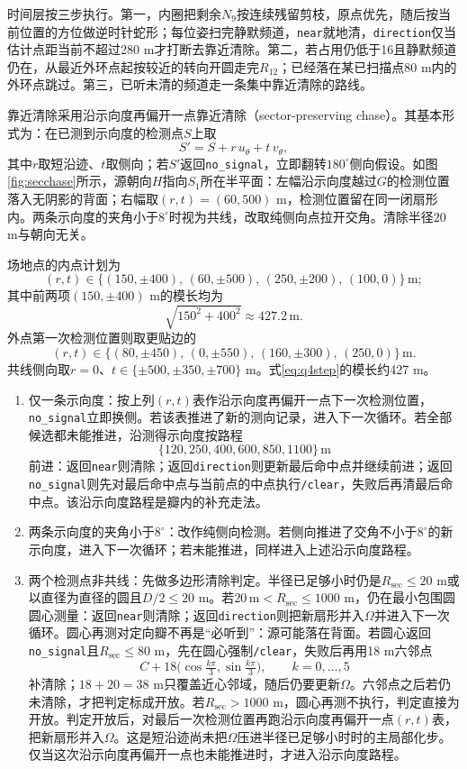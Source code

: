 \documentclass{cumcmthesis}
\begin{document}
时间层按三步执行。第一，内圈把剩余$N_9$按连续残留剪枝，原点优先，随后按当前位置的方位做逆时针蛇形；每位姿扫完静默频道，\texttt{near}就地清，\texttt{direction}仅当估计点距当前不超过280 m才打断去靠近清除。第二，若占用仍低于16且静默频道仍在，从最近外环点起按较近的转向开圆走完$R_{12}$；已经落在某已扫描点80 m内的外环点跳过。第三，已听未清的频道走一条集中靠近清除的路线。

靠近清除采用沿示向度再偏开一点靠近清除（sector-preserving chase）。其基本形式为：在已测到示向度的检测点$S$上取
\[
S'=S+r\,u_{\theta}+t\,v_{\theta},
\]
其中$r$取短沿迹、$t$取侧向；若$S'$返回\texttt{no\_signal}，立即翻转$180^\circ$侧向假设。如图\ref{fig:secchase}所示，源朝向$H$指向$S_1$所在半平面：左幅沿示向度越过$G$的检测位置落入无阴影的背面；右幅取$(r,t)=(60,500)$ m，检测位置留在同一闭扇形内。两条示向度的夹角小于$8^\circ$时视为共线，改取纯侧向点拉开交角。清除半径20 m与朝向无关。

场地点的内点计划为
\[
(r,t)\in\bigl\{(150,\pm 400),\,(60,\pm 500),\,(250,\pm 200),\,(100,0)\bigr\}\,\mathrm{m};
\]
其中前两项$(150,\pm 400)$ m的模长均为
\begin{equation}
\sqrt{150^2+400^2}\approx 427.2\,\mathrm{m}.
\label{eq:q4step}
\end{equation}
外点第一次检测位置则取更贴边的
\[
(r,t)\in\bigl\{(80,\pm 450),\,(0,\pm 550),\,(160,\pm 300),\,(250,0)\bigr\}\,\mathrm{m}.
\]
共线侧向取$r=0$、$t\in\{\pm 500,\pm 350,\pm 700\}$ m。式\eqref{eq:q4step}的模长约427 m。

\begin{enumerate}
\item 仅一条示向度：按上列$(r,t)$表作沿示向度再偏开一点下一次检测位置，\texttt{no\_signal}立即换侧。若该表推进了新的测向记录，进入下一次循环。若全部候选都未能推进，沿测得示向度按路程
\[
\{120,250,400,600,850,1100\}\,\mathrm{m}
\]
前进：返回\texttt{near}则清除；返回\texttt{direction}则更新最后命中点并继续前进；返回\texttt{no\_signal}则先对最后命中点与当前点的中点执行\texttt{/clear}，失败后再清最后命中点。该沿示向度路程是瓣内的补充走法。
\item 两条示向度的夹角小于$8^\circ$：改作纯侧向检测。若侧向推进了交角不小于$8^\circ$的新示向度，进入下一次循环；若未能推进，同样进入上述沿示向度路程。
\item 两个检测点非共线：先做多边形清除判定。半径已足够小时仍是$R_{\mathrm{sec}}\le 20$ m或以直径为直径的圆且$D/2\le 20$ m。若$20\,\mathrm{m}<R_{\mathrm{sec}}\le 1000$ m，仍在最小包围圆圆心测量：返回\texttt{near}则清除；返回\texttt{direction}则把新扇形并入$\Omega$并进入下一次循环。圆心再测对定向瓣不再是“必听到”：源可能落在背面。若圆心返回\texttt{no\_signal}且$R_{\mathrm{sec}}\le 80$ m，先在圆心强制\texttt{/clear}，失败后再用18 m六邻点
\[
C+18\bigl(\cos\tfrac{k\pi}{3},\sin\tfrac{k\pi}{3}\bigr),\qquad k=0,\ldots,5
\]
补清除；$18+20=38$ m只覆盖近心邻域，随后仍要更新$\Omega$。六邻点之后若仍未清除，才把判定标成开放。若$R_{\mathrm{sec}}>1000$ m，圆心再测不执行，判定直接为开放。判定开放后，对最后一次检测位置再跑沿示向度再偏开一点$(r,t)$表，把新扇形并入$\Omega$。这是短沿迹尚未把$\Omega$压进半径已足够小时时的主局部化步。仅当这次沿示向度再偏开一点也未能推进时，才进入沿示向度路程。
\end{enumerate}
\end{document}
